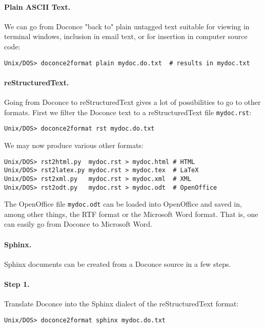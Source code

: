 \documentclass{article}
\begin{document}
\paragraph{Plain ASCII Text.}

We can go from Doconce "back to" plain untagged text suitable for viewing
in terminal windows, inclusion in email text, or for insertion in
computer source code:
\begin{Verbatim}[fontsize=\fontsize{9pt}{9pt},tabsize=8,baselinestretch=0.85,
fontfamily=tt,xleftmargin=7mm]
Unix/DOS> doconce2format plain mydoc.do.txt  # results in mydoc.txt
\end{Verbatim}
\noindent
\paragraph{reStructuredText.}

Going from Doconce to reStructuredText gives a lot of possibilities to
go to other formats. First we filter the Doconce text to a
reStructuredText file {\fontsize{10pt}{10pt}\verb!mydoc.rst!}:
\begin{Verbatim}[fontsize=\fontsize{9pt}{9pt},tabsize=8,baselinestretch=0.85,
fontfamily=tt,xleftmargin=7mm]
Unix/DOS> doconce2format rst mydoc.do.txt
\end{Verbatim}
\noindent
We may now produce various other formats:
\begin{Verbatim}[fontsize=\fontsize{9pt}{9pt},tabsize=8,baselinestretch=0.85,
fontfamily=tt,xleftmargin=7mm]
Unix/DOS> rst2html.py  mydoc.rst > mydoc.html # HTML
Unix/DOS> rst2latex.py mydoc.rst > mydoc.tex  # LaTeX
Unix/DOS> rst2xml.py   mydoc.rst > mydoc.xml  # XML
Unix/DOS> rst2odt.py   mydoc.rst > mydoc.odt  # OpenOffice
\end{Verbatim}
\noindent
The OpenOffice file {\fontsize{10pt}{10pt}\verb!mydoc.odt!} can be loaded into OpenOffice and
saved in, among other things, the RTF format or the Microsoft Word format.
That is, one can easily go from Doconce to Microsoft Word.
\paragraph{Sphinx.}

Sphinx documents can be created from a Doconce source in a few steps.

\paragraph{Step 1.}
Translate Doconce into the Sphinx dialect of
the reStructuredText format:
\begin{Verbatim}[fontsize=\fontsize{9pt}{9pt},tabsize=8,baselinestretch=0.85,
fontfamily=tt,xleftmargin=7mm]
Unix/DOS> doconce2format sphinx mydoc.do.txt
\end{Verbatim}
\noindent
\end{document}
